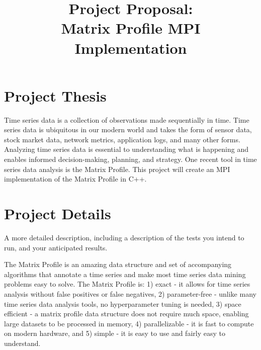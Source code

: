 \documentclass[conference]{IEEEtran}
\begin{document}
\title{Project Proposal:\\Matrix Profile MPI Implementation}

\author{
}


\maketitle


\section{Project Thesis}
Time series data is a collection of observations made sequentially in time.  Time series data is ubiquitous in our modern world and takes the form of sensor data, stock market data, network metrics, application logs, and many other forms.  Analyzing time series data is essential to understanding what is happening and enables informed decision-making, planning, and strategy.  One recent tool in time series data analysis is the Matrix Profile.  This project will create an MPI implementation of the Matrix Profile in C++.


\section{Project Details}
A more detailed description, including a description of the tests you intend to run, and your anticipated results.

The Matrix Profile \cite{MatrixProfile1} \cite{MatrixProfile2} is an amazing data structure and set of accompanying algorithms that annotate a time series and make most time series data mining problems easy to solve. The Matrix Profile is:  1) exact - it allows for time series analysis without false positives or false negatives, 2) parameter-free - unlike many time series data analysis tools, no hyperparameter tuning is needed, 3) space efficient - a matrix profile data structure does not require much space, enabling large datasets to be processed in memory, 4) parallelizable - it is fast to compute on modern hardware, and 5) simple - it is easy to use and fairly easy to understand.  
\end{document}
